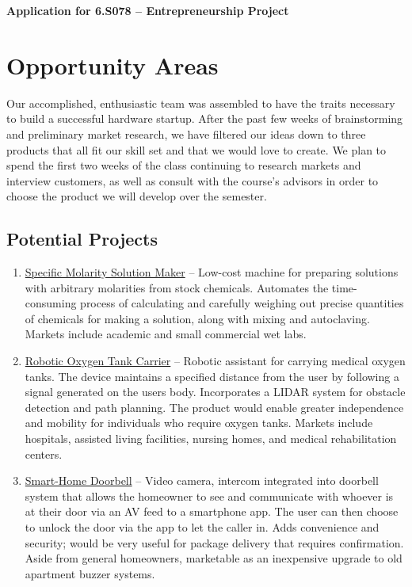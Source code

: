 \documentclass[8pt]{article}
\begin{document}
\begin{center}
\LARGE{\textbf{Application for 6.S078 -- Entrepreneurship Project}}
\end{center}

\vspace{.3cm}

\section*{Opportunity Areas}
Our accomplished, enthusiastic team was assembled to have the traits necessary
to build a successful hardware startup. After the past few weeks of
brainstorming and preliminary market research, we have filtered our ideas down
to three products that all fit our skill set and that we would love to create.
We plan to spend the first two weeks of the class continuing to research markets
and interview customers, as well as consult with the course's advisors in order
to choose the product we will develop over the semester.

\subsection*{Potential Projects}
\begin{enumerate}
\item \underline{Specific Molarity Solution Maker} -- Low-cost machine for preparing solutions with arbitrary molarities from stock chemicals. Automates the time-consuming process of calculating and carefully weighing out precise quantities of chemicals for making a solution, along with mixing and autoclaving. Markets include academic and small commercial wet labs.
\item \underline{Robotic Oxygen Tank Carrier} -- Robotic assistant for carrying medical oxygen tanks. The device maintains a specified distance from the user by following a signal generated on the users body. Incorporates a LIDAR system for obstacle detection and path planning. The product would enable greater independence and mobility for individuals who require oxygen tanks. Markets include hospitals, assisted living facilities, nursing homes, and medical rehabilitation centers.
\item \underline{Smart-Home Doorbell} -- Video camera, intercom integrated into doorbell system that allows the homeowner to see and communicate with whoever is at their door via an AV feed to a smartphone app. The user can then choose to unlock the door via the app to let the caller in. Adds convenience and security; would be very useful for package delivery that requires confirmation. Aside from general homeowners, marketable as an inexpensive upgrade to old apartment buzzer systems.
\end{enumerate}
\end{document}
